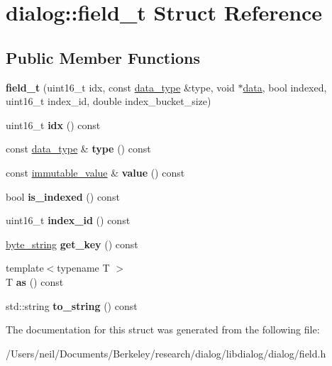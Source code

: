\hypertarget{structdialog_1_1field__t}{}\section{dialog\+:\+:field\+\_\+t Struct Reference}
\label{structdialog_1_1field__t}
\subsection*{Public Member Functions}
\begin{DoxyCompactItemize}
\item 
\mbox{\label{structdialog_1_1field__t_a38a5eac5a33bbc109cea5bec52243cf5}} 
{\bfseries field\+\_\+t} (uint16\+\_\+t idx, const \hyperlink{structdialog_1_1data__type}{data\+\_\+type} \&type, void $\ast$\hyperlink{structdialog_1_1data}{data}, bool indexed, uint16\+\_\+t index\+\_\+id, double index\+\_\+bucket\+\_\+size)
\item 
\mbox{\label{structdialog_1_1field__t_a37cb00c5b29296d901388b87077ae0a4}} 
uint16\+\_\+t {\bfseries idx} () const
\item 
\mbox{\label{structdialog_1_1field__t_a901ef5f8265f4e193e9e2395230b1722}} 
const \hyperlink{structdialog_1_1data__type}{data\+\_\+type} \& {\bfseries type} () const
\item 
\mbox{\label{structdialog_1_1field__t_a48b79aa56c9eec18e9be879a44531edb}} 
const \hyperlink{classdialog_1_1immutable__value}{immutable\+\_\+value} \& {\bfseries value} () const
\item 
\mbox{\label{structdialog_1_1field__t_a5c16ba60671457adc119b3877bb14887}} 
bool {\bfseries is\+\_\+indexed} () const
\item 
\mbox{\label{structdialog_1_1field__t_a200bca9e8bc82f756f202eb45555c199}} 
uint16\+\_\+t {\bfseries index\+\_\+id} () const
\item 
\mbox{\label{structdialog_1_1field__t_a0ed25ca8c151d86486a2d19be42dcd14}} 
\hyperlink{classdialog_1_1byte__string}{byte\+\_\+string} {\bfseries get\+\_\+key} () const
\item 
\mbox{\label{structdialog_1_1field__t_adec7e0f179006c4ffa5398b6d220deb8}} 
{\footnotesize template$<$typename T $>$ }\\T {\bfseries as} () const
\item 
\mbox{\label{structdialog_1_1field__t_af9be89078c159b53f29c4787ee85fd4d}} 
std\+::string {\bfseries to\+\_\+string} () const
\end{DoxyCompactItemize}


The documentation for this struct was generated from the following file\+:\begin{DoxyCompactItemize}
\item 
/\+Users/neil/\+Documents/\+Berkeley/research/dialog/libdialog/dialog/field.\+h\end{DoxyCompactItemize}
